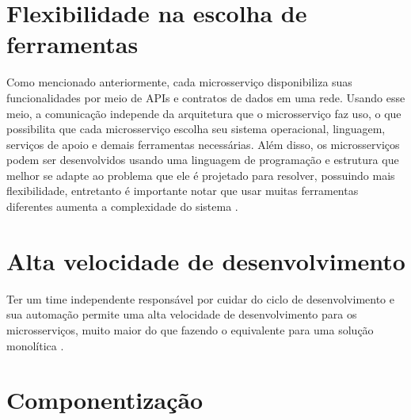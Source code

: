 

\section{Flexibilidade na escolha de ferramentas}

Como mencionado anteriormente, cada microsserviço disponibiliza suas funcionalidades por meio de APIs e contratos de dados em uma rede. Usando esse meio, a comunicação independe da arquitetura que o microsserviço faz uso, o que possibilita que cada microsserviço escolha seu sistema operacional, linguagem, serviços de apoio e demais ferramentas necessárias. Além disso, os microsserviços podem ser desenvolvidos usando uma linguagem de programação e estrutura que melhor se adapte ao problema que ele é projetado para resolver, possuindo mais flexibilidade, entretanto é importante notar que usar muitas ferramentas diferentes aumenta a complexidade do sistema \cite{oracle_microservices, Familiar2015}.

\section{Alta velocidade de desenvolvimento}

Ter um time independente responsável por cuidar do ciclo de desenvolvimento e sua automação permite uma alta velocidade de desenvolvimento para os microsserviços, muito maior do que fazendo o equivalente para uma solução monolítica \cite{Familiar2015}.

\section{Componentização}\label{secao-componentizacao}

